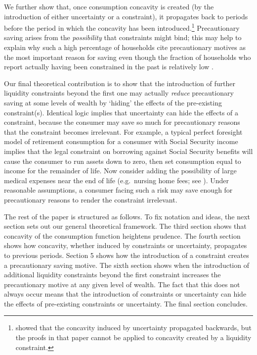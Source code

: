 \documentclass[titlepage]{\econtex}
\renewcommand{\cite}{\citeyear}
\begin{document}
We further show that, once consumption concavity is created (by the introduction of either uncertainty or a constraint), it propagates back to periods before the period in which the concavity has been introduced.\footnote{\citet{carroll&kimball:concavity} showed that the concavity induced by uncertainty propagated backwards, but the proofs in that paper cannot be applied to concavity created by a liquidity constraint.} %
Precautionary saving arises from the \textit{possibility} that constraints might bind; this may help to explain why such a high percentage of households cite precautionary motives as the most important reason for saving \citep{kennickell&lusardi:scfquestions} even though the fraction of households who report actually having been constrained in the past is relatively low \citep{jappelli:whoisconstr}.


Our final theoretical contribution is to show that the introduction of further liquidity constraints beyond the first one may actually \textit{reduce} precautionary saving at some levels of wealth by `hiding' the effects of the pre-existing constraint(s). Identical logic implies that uncertainty can hide the effects of a constraint, because the consumer may save so much for precautionary reasons that the constraint becomes irrelevant.  For example, a typical perfect foresight model of retirement consumption for a consumer with Social Security income implies that the legal constraint on borrowing against Social Security benefits will cause the consumer to run assets down to zero, then set consumption equal to income for the remainder of life.  Now consider adding the possibility of large medical expenses near the end of life (e.g.\ nursing home fees; see \cite{aclvJoy}).  Under reasonable assumptions, a consumer facing such a risk may save enough for precautionary reasons to render the constraint irrelevant.

The rest of the paper is structured as follows.  To fix notation and ideas, the next section sets out our general theoretical framework. The third section shows that concavity of the consumption function heightens prudence.  The fourth section shows how concavity, whether induced by constraints or uncertainty, propagates to previous periods. Section 5 shows how the introduction of a constraint creates a precautionary saving motive. The sixth section shows when the introduction of additional liquidity constraints beyond the first constraint increases the precautionary motive at any given level of wealth.  The fact that this does not always occur means that the introduction of constraints or uncertainty can hide the effects of pre-existing constraints or uncertainty. The final section concludes.
\end{document}

